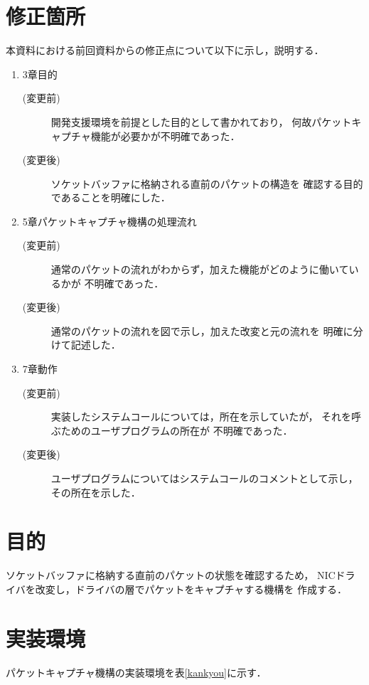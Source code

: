 \documentclass[12pt]{jsarticle}
\begin{document}
\section{修正箇所}
本資料における前回資料からの修正点について以下に示し，説明する．
\begin{enumerate}
    \item 3章目的
        \begin{description}
            \item[(変更前)]開発支援環境を前提とした目的として書かれており，
                何故パケットキャプチャ機能が必要かが不明確であった．
            \item[(変更後)]ソケットバッファに格納される直前のパケットの構造を
                確認する目的であることを明確にした．
        \end{description}
    \item 5章パケットキャプチャ機構の処理流れ
        \begin{description}
            \item[(変更前)]通常のパケットの流れがわからず，加えた機能がどのように働いているかが
                不明確であった．
            \item[(変更後)]通常のパケットの流れを図で示し，加えた改変と元の流れを
                明確に分けて記述した．
        \end{description}
    \item 7章動作
        \begin{description}
            \item[(変更前)]実装したシステムコールについては，所在を示していたが，
                それを呼ぶためのユーザプログラムの所在が
                不明確であった．
            \item[(変更後)]ユーザプログラムについてはシステムコールのコメントとして示し，
                その所在を示した．
        \end{description}
\end{enumerate}

\section{目的}
ソケットバッファに格納する直前のパケットの状態を確認するため，
NICドライバを改変し，ドライバの層でパケットをキャプチャする機構を
作成する．

\section{実装環境}
パケットキャプチャ機構の実装環境を表\ref{kankyou}に示す．
\end{document}
